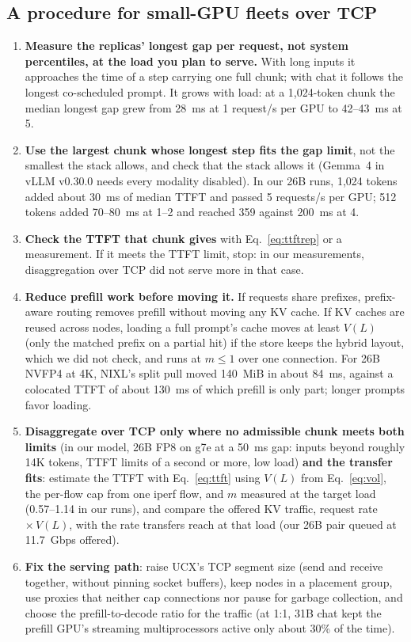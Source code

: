 \documentclass[11pt]{article}
\begin{document}
\subsection{A procedure for small-GPU fleets over TCP}\label{sec:procedure-fleet}
\begin{enumerate}
  \item \textbf{Measure the replicas' longest gap per request, not system percentiles, at the load you plan to serve.} With long inputs it approaches the time of a step carrying one full chunk; with chat it follows the longest co-scheduled prompt. It grows with load: at a 1,024-token chunk the median longest gap grew from 28~ms at 1 request/s per GPU to 42--43~ms at 5.
  \item \textbf{Use the largest chunk whose longest step fits the gap limit}, not the smallest the stack allows, and check that the stack allows it (Gemma~4 in vLLM v0.30.0 needs every modality disabled). In our 26B runs, 1,024 tokens added about 30~ms of median TTFT and passed 5 requests/s per GPU; 512 tokens added 70--80~ms at 1--2 and reached 359 against 200~ms at 4.
  \item \textbf{Check the TTFT that chunk gives} with Eq.~\eqref{eq:ttftrep} or a measurement. If it meets the TTFT limit, stop: in our measurements, disaggregation over TCP did not serve more in that case.
  \item \textbf{Reduce prefill work before moving it.} If requests share prefixes, prefix-aware routing removes prefill without moving any KV cache. If KV caches are reused across nodes, loading a full prompt's cache moves at least $V(L)$ (only the matched prefix on a partial hit) if the store keeps the hybrid layout, which we did not check, and runs at $m \le 1$ over one connection. For 26B NVFP4 at 4K, NIXL's split pull moved 140~MiB in about 84~ms, against a colocated TTFT of about 130~ms of which prefill is only part; longer prompts favor loading.
  \item \textbf{Disaggregate over TCP only where no admissible chunk meets both limits} (in our model, 26B FP8 on g7e at a 50~ms gap: inputs beyond roughly 14K tokens, TTFT limits of a second or more, low load) \textbf{and the transfer fits}: estimate the TTFT with Eq.~\eqref{eq:ttft} using $V(L)$ from Eq.~\eqref{eq:vol}, the per-flow cap from one iperf flow, and $m$ measured at the target load (0.57--1.14 in our runs), and compare the offered KV traffic, request rate $\times\,V(L)$, with the rate transfers reach at that load (our 26B pair queued at 11.7~Gbps offered).
  \item \textbf{Fix the serving path}: raise UCX's TCP segment size (send and receive together, without pinning socket buffers), keep nodes in a placement group, use proxies that neither cap connections nor pause for garbage collection, and choose the prefill-to-decode ratio for the traffic (at 1:1, 31B chat kept the prefill GPU's streaming multiprocessors active only about 30\% of the time).
\end{enumerate}
\end{document}
